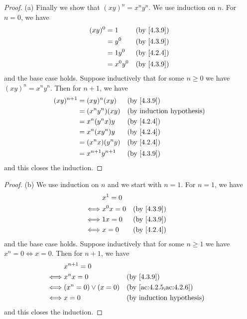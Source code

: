 \begin{proof}{(a)}
  Finally we show that \((xy)^n = x^n y^n\).
  We use induction on \(n\).
  For \(n = 0\), we have
  \begin{align*}
    (xy)^0 & = 1       &  & \text{(by \cref{4.3.9})} \\
           & = y^0     &  & \text{(by \cref{4.3.9})} \\
           & = 1y^0    &  & \text{(by \cref{4.2.4})} \\
           & = x^0 y^0 &  & \text{(by \cref{4.3.9})}
  \end{align*}
  and the base case holds.
  Suppose inductively that for some \(n \geq 0\) we have \((xy)^n = x^n y^n\).
  Then for \(n + 1\), we have
  \begin{align*}
    (xy)^{n + 1} & = (xy)^n (xy)         &  & \text{(by \cref{4.3.9})}         \\
                 & = (x^n y^n) (xy)      &  & \text{(by induction hypothesis)} \\
                 & = x^n (y^n x) y       &  & \text{(by \cref{4.2.4})}         \\
                 & = x^n (x y^n) y       &  & \text{(by \cref{4.2.4})}         \\
                 & = (x^n x)(y^n y)      &  & \text{(by \cref{4.2.4})}         \\
                 & = x^{n + 1} y^{n + 1} &  & \text{(by \cref{4.3.9})}
  \end{align*}
  and this closes the induction.
\end{proof}

\begin{proof}{(b)}
  We use induction on \(n\) and we start with \(n = 1\).
  For \(n = 1\), we have
  \begin{align*}
         & x^1 = 0                                 \\
    \iff & x^0 x = 0 &  & \text{(by \cref{4.3.9})} \\
    \iff & 1x = 0    &  & \text{(by \cref{4.3.9})} \\
    \iff & x = 0     &  & \text{(by \cref{4.2.4})}
  \end{align*}
  and the base case holds.
  Suppose inductively that for some \(n \geq 1\) we have \(x^n = 0 \iff x = 0\).
  Then for \(n + 1\), we have
  \begin{align*}
         & x^{n + 1} = 0                                                    \\
    \iff & x^n x = 0              &  & \text{(by \cref{4.3.9})}             \\
    \iff & (x^n = 0) \lor (x = 0) &  & \text{(by \cref{ac:4.2.5,ac:4.2.6})} \\
    \iff & x = 0                  &  & \text{(by induction hypothesis)}
  \end{align*}
  and this closes the induction.
\end{proof}

